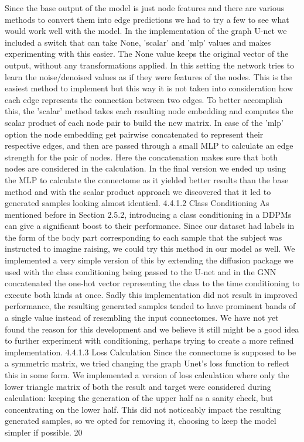 	Since the base output of the model is just node features and there are various methods to convert them into edge predictions\cite{li2023evaluating} we had to try a few to see what would work well with the model. In the implementation of the graph U-net we included a switch that
	can take None, ’scalar’ and ’mlp’ values and makes experimenting with this easier. The
	None value keeps the original vector of the output, without any transformations applied.
	In this setting the network tries to learn the noise/denoised values as if they were features
	of the nodes. This is the easiest method to implement but this way it is not taken into
	consideration how each edge represents the connection between two edges.
	To better accomplish this, the ’scalar’ method takes each resulting node embedding and
	computes the scalar product of each node pair to build the new matrix. In case of the
	’mlp’ option the node embedding get pairwise concatenated to represent their respective
	edges, and then are passed through a small MLP to calculate an edge strength for the
	pair of nodes. Here the concatenation makes sure that both nodes are considered in the
	calculation.
	In the final version we ended up using the MLP to calculate the connectome as it yielded
	better results than the base method and with the scalar product approach we discovered
	that it led to generated samples looking almost identical.
	4.4.1.2 Class Conditioning
	As mentioned before in Section 2.5.2, introducing a class conditioning in a DDPMs can
	give a significant boost to their performance. Since our dataset had labels in the form of
	the body part corresponding to each sample that the subject was instructed to imagine
	raising, we could try this method in our model as well. We implemented a very simple
	version of this by extending the diffusion package we used with the class conditioning
	being passed to the U-net and in the GNN concatenated the one-hot vector representing
	the class to the time conditioning to execute both kinds at once.
	Sadly this implementation did not result in improved performance, the resulting generated
	samples tended to have prominent bands of a single value instead of resembling the input
	connectomes. We have not yet found the reason for this development and we believe it still
	might be a good idea to further experiment with conditioning, perhaps trying to create a
	more refined implementation.
	4.4.1.3 Loss Calculation
	Since the connectome is supposed to be a symmetric matrix, we tried changing the graph Unet’s loss function to reflect this in some form. We implemented a version of loss calculation
	where only the lower triangle matrix of both the result and target were considered during
	calculation: keeping the generation of the upper half as a sanity check, but concentrating
	on the lower half. This did not noticeably impact the resulting generated samples, so we
	opted for removing it, choosing to keep the model simpler if possible.
	20
	
